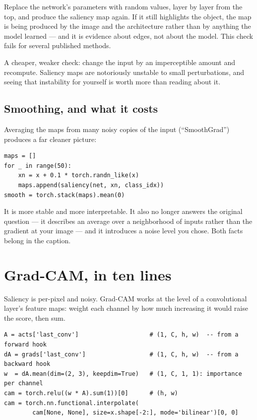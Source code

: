 \documentclass[11pt]{article}
\begin{document}
\begin{keybox}
 Replace the network's parameters with
random values, layer by layer from the top, and produce the saliency map again.
If it still highlights the object, the map is being produced by the image and
the architecture rather than by anything the model learned --- and it is
evidence about edges, not about the model. This check fails for several
published methods.
\end{keybox}

A cheaper, weaker check: change the input by an imperceptible amount and
recompute. Saliency maps are notoriously unstable to small perturbations, and
seeing that instability for yourself is worth more than reading about it.

\subsection{Smoothing, and what it costs}

Averaging the maps from many noisy copies of the input (``SmoothGrad'') produces
a far cleaner picture:

\begin{lstlisting}
maps = []
for _ in range(50):
    xn = x + 0.1 * torch.randn_like(x)
    maps.append(saliency(net, xn, class_idx))
smooth = torch.stack(maps).mean(0)
\end{lstlisting}

It is more stable and more interpretable. It also no longer answers the original
question --- it describes an average over a neighborhood of inputs rather than
the gradient at your image --- and it introduces a noise level you chose. Both
facts belong in the caption.

\section{Grad-CAM, in ten lines}

Saliency is per-pixel and noisy. Grad-CAM works at the level of a convolutional
layer's feature maps: weight each channel by how much increasing it would raise
the score, then sum.

\begin{lstlisting}
A = acts['last_conv']                    # (1, C, h, w)  -- from a forward hook
dA = grads['last_conv']                  # (1, C, h, w)  -- from a backward hook
w  = dA.mean(dim=(2, 3), keepdim=True)   # (1, C, 1, 1): importance per channel
cam = torch.relu((w * A).sum(1))[0]      # (h, w)
cam = torch.nn.functional.interpolate(
        cam[None, None], size=x.shape[-2:], mode='bilinear')[0, 0]
\end{lstlisting}
\end{document}
